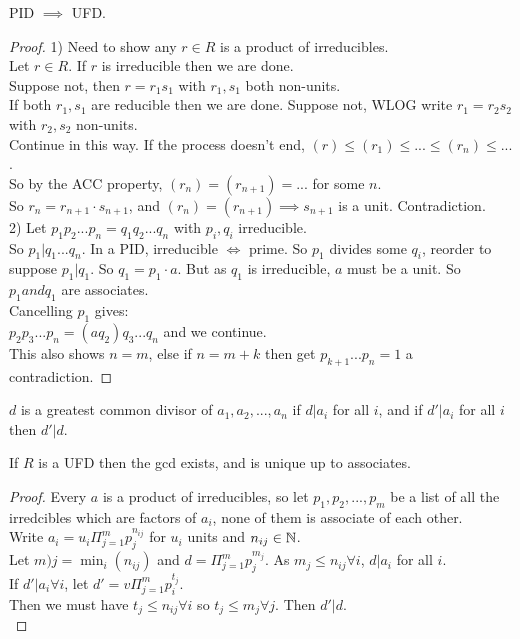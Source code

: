 \documentclass[a4paper]{article}
\begin{document}
\begin{prop}
PID $\implies$ UFD.
\begin{proof}
1) Need to show any $r\in R$ is a product of irreducibles.\\
Let $r\in R$. If $r$ is irreducible then we are done.\\
Suppose not, then $r=r_{1}s_{1}$ with $r_{1},s_{1}$ both non-units.\\
If both $r_{1},s_{1}$ are reducible then we are done. Suppose not, WLOG write $r_{1}=r_{2}s_{2}$ with $r_{2},s_{2}$ non-units.\\
Continue in this way. If the process doesn't end, $\left(r\right) \leq \left(r_{1}\right) \leq ... \leq \left(r_{n}\right) \leq ...$.\\
So by the ACC property, $\left(r_{n}\right)=\left(r_{n+1}\right)=...$ for some $n$.\\
So $r_{n}=r_{n+1}\cdot s_{n+1}$, and $\left(r_{n}\right)=\left(r_{n+1}\right) \implies s_{n+1}$ is a unit. Contradiction.\\
2) Let $p_{1}p_{2}...p_{n}=q_{1}q_{2}...q_{n}$ with $p_{i},q_{i}$ irreducible.\\
So $p_{1} | q_{1}...q_{n}$. In a PID, irreducible $\iff$ prime. So $p_{1}$ divides some $q_{i}$, reorder to suppose $p_{1}|q_{1}$. So $q_{1}=p_{1}\cdot a$. But as $q_{1}$ is irreducible, $a$ must be a unit. So $p_{1} and q_{1}$ are associates.\\
Cancelling $p_{1}$ gives:\\
$p_{2}p_{3}...p_{n}=\left(aq_{2}\right)q_{3}...q_{n}$ and we continue.\\
This also shows $n=m$, else if $n=m+k$ then get $p_{k+1}...p_{n}=1$ a contradiction.
\end{proof}
\end{prop}

\begin{defi}
$d$ is a greatest common divisor of $a_{1},a_{2},...,a_{n}$ if $d|a_{i}$ for all $i$, and if $d'|a_{i}$ for all $i$ then $d'|d$.
\end{defi}

\begin{lemma}
If $R$ is a UFD then the gcd exists, and is unique up to associates.
\begin{proof}
Every $a$ is a product of irreducibles, so let $p_{1},p_{2},...,p_{m}$ be a list of all the irredcibles which are factors of $a_{i}$, none of them is associate of each other.\\
Write $a_{i}=u_{i}\Pi_{j=1}^{m} p_{j}^{n_{ij}}$ for $u_{i}$ units and $n_{ij} \in \mathbb{N}$.\\
Let $m){j}=\min_{i}\left(n_{ij}\right)$ and $d=\Pi_{j=1}^m p_{j}^{m_{j}}$. As $m_{j} \leq n_{ij} \forall i$, $d|a_{i}$ for all $i$.\\
If $d'|a_{i} \forall i$, let $d'=v \Pi_{j=1}^m p_{i}^{t_{j}}$.\\
Then we must have $t_{j} \leq n_{ij} \forall i$ so $t_{j} \leq m_{j} \forall j$. Then $d'|d$.\\
\end{proof}
\end{lemma}
\end{document}
